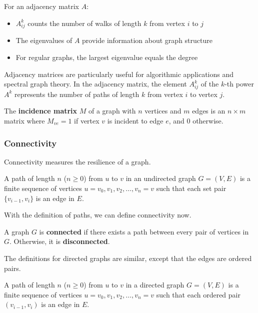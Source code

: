 \begin{theorem}
For an adjacency matrix $A$:
\begin{itemize}
    \item $A^k_{ij}$ counts the number of walks of length $k$ from vertex $i$ to $j$
    \item The eigenvalues of $A$ provide information about graph structure
    \item For regular graphs, the largest eigenvalue equals the degree
\end{itemize}
\end{theorem}

Adjacency matrices are particularly useful for algorithmic applications and spectral graph theory. In the adjacency matrix, the element $A^k_{ij}$ of the $k$-th power $A^k$ represents the number of paths of length $k$ from vertex $i$ to vertex $j$.

\begin{definition}
The \textbf{incidence matrix} $M$ of a graph with $n$ vertices and $m$ edges is an $n \times m$ matrix where $M_{ve} = 1$ if vertex $v$ is incident to edge $e$, and $0$ otherwise.
\end{definition}

\subsubsection{Connectivity}

Connectivity measures the resilience of a graph.

\begin{definition}
A path of length $n$ ($n \geq 0$) from $u$ to $v$ in an undirected graph $G=(V,E)$ is a finite sequence of vertices $u = v_0, v_1, v_2, \ldots, v_n = v$ such that each set pair $\{v_{i-1}, v_i\}$ is an edge in $E$.
\end{definition}

With the definition of paths, we can define connectivity now.

\begin{definition}
A graph $G$ is \textbf{connected} if there exists a path between every pair of vertices in $G$. Otherwise, it is \textbf{disconnected}.
\end{definition}

The definitions for directed graphs are similar, except that the edges are ordered pairs.

\begin{definition}
A path of length $n$ ($n \geq 0$) from $u$ to $v$ in a directed graph $G=(V,E)$ is a finite sequence of vertices $u = v_0, v_1, v_2, \ldots, v_n = v$ such that each ordered pair $(v_{i-1}, v_i)$ is an edge in $E$.
\end{definition}

